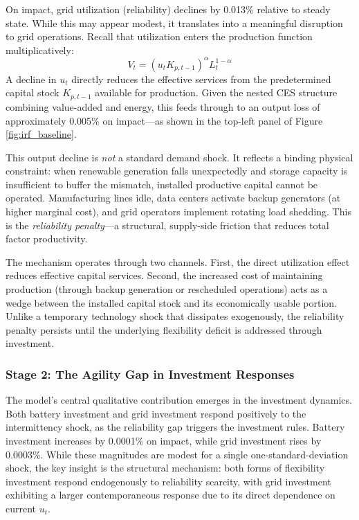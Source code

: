 \documentclass[12pt, a4paper]{article}
\begin{document}
On impact, grid utilization (reliability) declines by 0.013\% relative to steady state. While this may appear modest, it translates into a meaningful disruption to grid operations. Recall that utilization enters the production function multiplicatively:
\begin{equation*}
V_t = (u_t K_{p,t-1})^\alpha L_t^{1-\alpha}
\end{equation*}
A decline in $u_t$ directly reduces the effective services from the predetermined capital stock $K_{p,t-1}$ available for production. Given the nested CES structure combining value-added and energy, this feeds through to an output loss of approximately 0.005\% on impact---as shown in the top-left panel of Figure \ref{fig:irf_baseline}.

This output decline is \textit{not} a standard demand shock. It reflects a binding physical constraint: when renewable generation falls unexpectedly and storage capacity is insufficient to buffer the mismatch, installed productive capital cannot be operated. Manufacturing lines idle, data centers activate backup generators (at higher marginal cost), and grid operators implement rotating load shedding. This is the \textit{reliability penalty}---a structural, supply-side friction that reduces total factor productivity.

The mechanism operates through two channels. First, the direct utilization effect reduces effective capital services. Second, the increased cost of maintaining production (through backup generation or rescheduled operations) acts as a wedge between the installed capital stock and its economically usable portion. Unlike a temporary technology shock that dissipates exogenously, the reliability penalty persists until the underlying flexibility deficit is addressed through investment.

\subsubsection{Stage 2: The Agility Gap in Investment Responses}

The model's central qualitative contribution emerges in the investment dynamics. Both battery investment and grid investment respond positively to the intermittency shock, as the reliability gap triggers the investment rules. Battery investment increases by 0.0001\% on impact, while grid investment rises by 0.0003\%. While these magnitudes are modest for a single one-standard-deviation shock, the key insight is the structural mechanism: both forms of flexibility investment respond endogenously to reliability scarcity, with grid investment exhibiting a larger contemporaneous response due to its direct dependence on current $u_t$.
\end{document}
